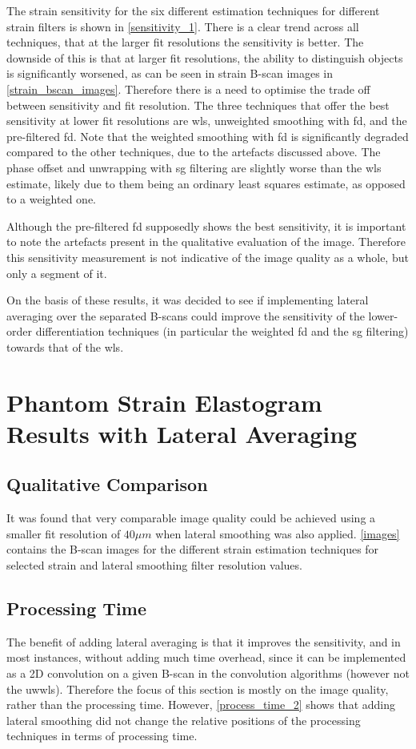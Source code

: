 The strain sensitivity for the six different estimation techniques for different strain filters is shown in \autoref{sensitivity_1}. There is a clear trend across all techniques, that at the larger fit resolutions the sensitivity is better. The downside of this is that at larger fit resolutions, the ability to distinguish objects is significantly worsened, as can be seen in strain B-scan images in \autoref{strain_bscan_images}. Therefore there is a need to optimise the trade off between sensitivity and fit resolution. The three techniques that offer the best sensitivity at lower fit resolutions are \ac{wls}, unweighted smoothing with \ac{fd}, and the pre-filtered \ac{fd}. Note that the weighted smoothing with \ac{fd} is significantly degraded compared to the other techniques, due to the artefacts discussed above. The phase offset and unwrapping with \ac{sg} filtering are slightly worse than the \ac{wls} estimate, likely due to them being an ordinary least squares estimate, as opposed to a weighted one.

Although the pre-filtered \ac{fd} supposedly shows the best sensitivity, it is important to note the artefacts present in the qualitative evaluation of the image. Therefore this sensitivity measurement is not indicative of the image quality as a whole, but only a segment of it.

On the basis of these results, it was decided to see if implementing lateral averaging over the separated B-scans could improve the sensitivity of the lower-order differentiation techniques (in particular the weighted \ac{fd} and the \ac{sg} filtering) towards that of the \ac{wls}. 

\section{Phantom Strain Elastogram Results with Lateral Averaging}\label{phantom_results_lateral}

\subsection{Qualitative Comparison}
It was found that very comparable image quality could be achieved using a smaller fit resolution of $40\mu m$ when lateral smoothing was also applied. \autoref{images} contains the B-scan  images for the different strain estimation techniques for selected strain and lateral smoothing filter resolution values. 

\subsection{Processing Time}
The benefit of adding lateral averaging is that it improves the sensitivity, and in most instances, without adding much time overhead, since it can be implemented as a 2D convolution on a given B-scan in the convolution algorithms (however not the \ac{uwwls}). Therefore the focus of this section is mostly on the image quality, rather than the processing time. However, \autoref{process_time_2} shows that adding lateral smoothing did not change the relative positions of the processing techniques in terms of processing time.

